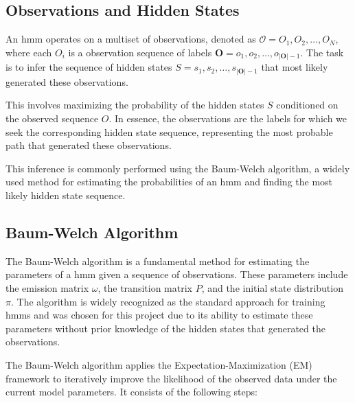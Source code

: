 \subsection{Observations and Hidden States}\label{subsec:observations-hidden-states}
An \gls{hmm} operates on a multiset of observations, denoted as  $\mathcal{O} = {O_1, O_2, \ldots, O_N}$, where each $O_i$ is a observation sequence of labels $\mathbf{O} = o_1, o_2, \ldots, o_{|\mathbf{O}|-1}$.
The task is to infer the sequence of hidden states $S = s_1, s_2, \ldots, s_{|\mathbf{O}|-1}$ that most likely generated these observations.

This involves maximizing the probability of the hidden states $S$ conditioned on the observed sequence $O$. In essence, the observations are the labels for which we seek the corresponding hidden state sequence, representing the most probable path that generated these observations.

This inference is commonly performed using the Baum-Welch algorithm, a widely used method for estimating the probabilities of an \gls{hmm} and finding the most likely hidden state sequence.

\subsection{Baum-Welch Algorithm}\label{subsec:baum-welch}
The Baum-Welch algorithm is a fundamental method for estimating the parameters of a \gls{hmm} given a sequence of observations. 
These parameters include the emission matrix $\omega$, the transition matrix $P$, and the initial state distribution $\pi$.
The algorithm is widely recognized as the standard approach for training \glspl{hmm} and was chosen for this project due to its ability to estimate these parameters without prior knowledge of the hidden states that generated the observations.

The Baum-Welch algorithm applies the Expectation-Maximization (EM) framework to iteratively improve the likelihood of the observed data under the current model parameters. It consists of the following steps:

